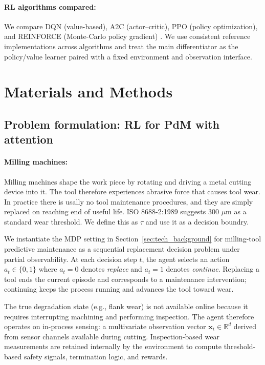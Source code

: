 \documentclass[sn-basic]{sn-jnl} %
\begin{document}
\paragraph{RL algorithms compared:}
We compare DQN (value-based), A2C (actor--critic), PPO (policy optimization), and \textsc{REINFORCE} (Monte-Carlo policy gradient) \cite{Mnih2015, Schulman2017, Williams1992}. We use consistent reference implementations across algorithms and treat the main differentiator as the policy/value learner paired with a fixed environment and observation interface.

\section{Materials and Methods}
\label{sec:method}

\subsection{Problem formulation: RL for PdM with attention}
\label{sec:env} \label{app:env_reward}
\paragraph{Milling machines:}
Milling machines shape the work piece by rotating and driving a metal cutting device into it. The tool therefore experiences abrasive force that causes tool wear. In practice there is usally no tool maintenance procedures, and they are simply replaced on reaching end of useful life. ISO 8688-2:1989 suggests 300 $\mu$m as a standard wear threshold. We define this as $\tau$ and use it as a decision boundry.

We instantiate the MDP setting in Section~\ref{sec:tech_background} for milling-tool predictive maintenance as a sequential replacement decision problem under partial observability. At each decision step $t$, the agent selects an action $a_t\in\{0,1\}$ where $a_t=0$ denotes \emph{replace} and $a_t=1$ denotes \emph{continue}. Replacing a tool ends the current episode and corresponds to a maintenance intervention; continuing keeps the process running and advances the tool toward wear.

The true degradation state (e.g., flank wear) is not available online because it requires interrupting machining and performing inspection. The agent therefore operates on in-process sensing: a multivariate observation vector $\mathbf{x}_t\in\mathbb{R}^d$ derived from sensor channels available during cutting. Inspection-based wear measurements are retained internally by the environment to compute threshold-based safety signals, termination logic, and rewards.
\end{document}
